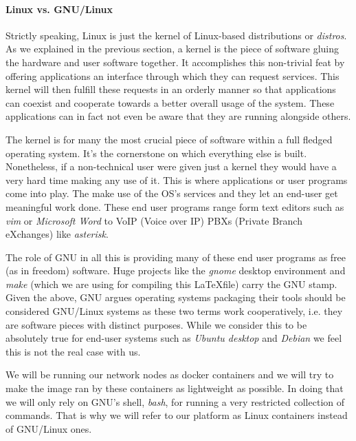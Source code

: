             \paragraph{Linux vs. GNU/Linux}
                Strictly speaking, Linux is just the kernel of Linux-based distributions or \textit{distros}. As we explained in the previous section, a kernel is the piece of software gluing the hardware and user software together. It accomplishes this non-trivial feat by offering applications an interface through which they can request services. This kernel will then fulfill these requests in an orderly manner so that applications can coexist and cooperate towards a better overall usage of the system. These applications can in fact not even be aware that they are running alongside others.

                The kernel is for many the most crucial piece of software within a full fledged operating system. It's the cornerstone on which everything else is built. Nonetheless, if a non-technical user were given just a kernel they would have a very hard time making any use of it. This is where applications or user programs come into play. The make use of the OS's services and they let an end-user get meaningful work done. These end user programs range form text editors such as \textit{vim} or \textit{Microsoft Word} to VoIP (Voice over IP) PBXs (Private Branch eXchanges) like \textit{asterisk}.

                The role of GNU in all this is providing many of these end user programs as free (as in freedom) software. Huge projects like the \textit{gnome} desktop environment and \textit{make} (which we are using for compiling this \LaTeX file) carry the GNU stamp. Given the above, GNU argues operating systems packaging their tools should be considered GNU/Linux systems as these two terms work cooperatively, i.e. they are software pieces with distinct purposes. While we consider this to be absolutely true for end-user systems such as \textit{Ubuntu desktop} and \textit{Debian} we feel this is not the real case with us.

                We will be running our network nodes as docker containers and we will try to make the image ran by these containers as lightweight as possible. In doing that we will only rely on GNU's shell, \textit{bash}, for running a very restricted collection of commands. That is why we will refer to our platform as Linux containers instead of GNU/Linux ones.

